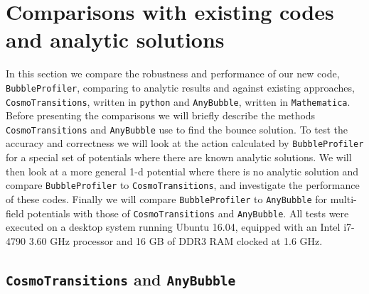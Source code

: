 \documentclass[final,3p,11pt,pdflatex]{elsarticle}
\makeatletter
\newcommand{\ab}{\texttt{AnyBubble}\@\xspace}
\newcommand{\bp}{\texttt{BubbleProfiler}\@\xspace}
\newcommand{\code}[1]{\ifmmode\text{\nolinkurl{#1}}\else\nolinkurl{#1}\fi}
\newcommand{\cosmo}{\texttt{CosmoTransitions}\@\xspace}
\makeatother
\begin{document}
\section{Comparisons with existing codes and analytic solutions}
\label{sec:tests}
In this section we compare the robustness and performance of our new
code, \bp, comparing to analytic results and against existing
approaches, \cosmo, written in \code{python} and \ab, written in
\code{Mathematica}.  Before presenting the comparisons we will briefly
describe the methods \cosmo and \ab use to find the bounce
solution. To test the accuracy and correctness we will look at the
action calculated by \bp for a special set of potentials where there
are known analytic solutions. We will then look at a more general 1-d
potential where there is no analytic solution and compare \bp to
\cosmo, and investigate the performance of these codes.
Finally we will compare \bp to \ab for multi-field potentials with those of
\cosmo and \ab. All tests were executed on a desktop system running
Ubuntu 16.04, equipped with an Intel i7-4790 3.60 GHz processor and 16
GB of DDR3 RAM clocked at 1.6 GHz.

\subsection{\cosmo and \ab}
\end{document}
